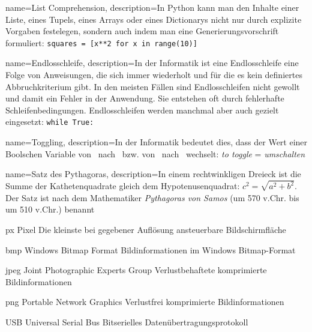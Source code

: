 {
	name={List Comprehension},
	description={In Python kann man den Inhalte einer Liste, eines Tupels, eines Arrays oder eines Dictionarys nicht nur durch explizite Vorgaben festelegen, sondern auch indem man eine Generierungsvorschrift formuliert: \texttt{squares = [x**2 for x in range(10)]}} 
}

{
	name={Endlosschleife},
	description={In der Informatik ist eine Endlosschleife eine Folge von Anweisungen, die sich immer wiederholt und für die es kein definiertes Abbruchkriterium gibt. In den meisten Fällen sind Endlosschleifen nicht gewollt und damit ein Fehler in der Anwendung. Sie entstehen oft durch fehlerhafte Schleifenbedingungen. Endlosschleifen werden manchmal aber auch gezielt eingesetzt: \texttt{while True:}} 
}

{
	name={Toggling},
	description={In der Informatik bedeutet dies, dass der Wert einer Boolschen Variable von \true\ nach \false\ bzw. von \false\ nach \true\ wechselt: \emph{to toggle} = \emph{umschalten}} 
}

{
	name={Satz des Pythagoras},
	description={In einem rechtwinkligen Dreieck ist die Summe der Kathetenquadrate gleich dem Hypotenusenquadrat: $c^2 = \sqrt{a^2 + b^2}$. Der Satz ist nach dem Mathematiker \emph{Pythagoras von Samos} (um 570 v.Chr. bis um 510 v.Chr.) benannt} 
}




  {px}            %
  {Pixel}  %
  {Die kleinste bei gegebener Auflösung ansteuerbare Bildschirmfläche} %

  {bmp}            %
  {Windows Bitmap Format}  %
  {Bildinformationen im Windows Bitmap-Format} %

  {jpeg}            %
  {Joint Photographic Experts Group}  %
  {Verlustbehaftete komprimierte Bildinformationen} %

  {png}            %
  {Portable Network Graphics}  %
  {Verlustfrei komprimierte Bildinformationen} %

  {USB}            %
  {Universal Serial Bus}  %
  {Bitserielles Datenübertragungsprotokoll} %

